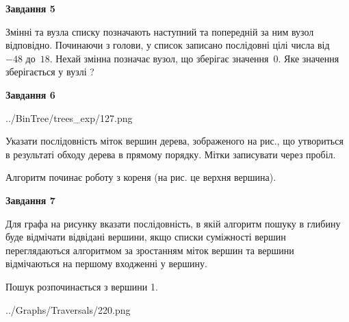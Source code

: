 \documentclass[12pt, ukrainian]{article}
\begin{document}
{\begin {large}
{\begin {center}\textbf{Завдання 5}\end {center}}\par
Змінні  та  вузла списку позначають наступний та попередній за ним вузол відповідно. Починаючи з голови, у список записано послідовні цілі числа від~$-48$ до~$18$. Нехай змінна  позначає вузол, що зберігає значення~$0$.
Яке значення зберігається у вузлі  ?\par
\newpage

{\begin {center}\textbf{Завдання 6}\end {center}}\par

\begin{center}
	{../BinTree/trees_exp/127.png}
\end{center}
Указати послідовність міток вершин дерева, зображеного на рис., що утвориться в результаті обходу дерева в прямому порядку. Мітки записувати через пробіл.\par Алгоритм починає роботу з кореня (на рис. це верхня вершина).\par
\newpage

{\begin {center}\textbf{Завдання 7}\end {center}}\par
Для графа на рисунку вказати послідовність, в якій алгоритм пошуку в глибину буде відмічати відвідані вершини, якщо списки суміжності вершин переглядаються алгоритмом за зростанням міток вершин та вершини відмічаються на першому вход\-женні у вершину.\par
Пошук розпочинається з вершини 1.\par

\begin{center}
	{../Graphs/Traversals/220.png}
\end{center}\par
\newpage


\end{large}}
\end{document}
